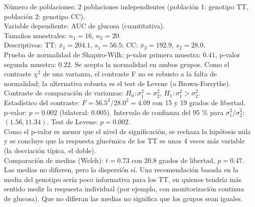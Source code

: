 \documentclass[
  spanish,
  a4paper,
]{scrreport}
\theoremstyle{definition}
\theoremstyle{remark}
\begin{document}
\begin{tcolorbox}[enhanced jigsaw, arc=.35mm, bottomrule=.15mm, bottomtitle=1mm, breakable, colback=white, colbacktitle=quarto-callout-tip-color!10!white, colframe=quarto-callout-tip-color-frame, coltitle=black, left=2mm, leftrule=.75mm, opacityback=0, opacitybacktitle=0.6, rightrule=.15mm, title=\textcolor{quarto-callout-tip-color}{\faLightbulb}\hspace{0.5em}{Solución}, titlerule=0mm, toprule=.15mm, toptitle=1mm]

Número de poblaciones: 2 poblaciones independientes (población 1:
genotipo TT, población 2: genotipo CC).\\
Variable dependiente: AUC de glucosa (cuantitativa).\\
Tamaños muestrales: \(n_1=16\), \(n_2=20\).\\
Descriptivos: TT: \(\bar x_1=204.1\), \(s_1=56.5\); CC:
\(\bar x_2=192.9\), \(s_2=28.0\).\\
Prueba de normalidad de Shapiro-Wilk: p-valor primera muestra: \(0.41\),
p-valor segunda muestra: \(0.22\). Se acepta la normalidad en ambos
grupos. Como el contraste \(\chi^2\) de una varianza, el contraste F no
es robusto a la falta de normalidad; la alternativa robusta es el test
de Levene (o Brown-Forsythe).\\
Contraste de comparación de varianzas: \(H_0:\sigma_1^2=\sigma_2^2\),
\(H_1:\sigma_1^2>\sigma_2^2\).\\
Estadístico del contraste: \(F=56.5^2/28.0^2=4.09\) con 15 y 19 grados
de libertad.\\
p-valor: \(p=0.002\) (bilateral: \(0.005\)). Intervalo de confianza del
95 \% para \(\sigma_1^2/\sigma_2^2\): \((1.56, 11.34)\). Test de Levene:
\(p=0.002\).\\
Como el p-valor es menor que el nivel de significación, se rechaza la
hipótesis nula y se concluye que la respuesta glucémica de los TT es
unas 4 veces más variable (la desviación típica, el doble).\\
Comparación de medias (Welch): \(t=0.73\) con 20.8 grados de libertad,
\(p=0.47\). Las medias no difieren, pero la dispersión sí. Una
recomendación basada en la media del genotipo sería poco informativa
para los TT, en quienes tendría más sentido medir la respuesta
individual (por ejemplo, con monitorización continua de glucosa). Que no
difieran las medias no significa que los grupos sean iguales.

\end{tcolorbox}
\end{document}
